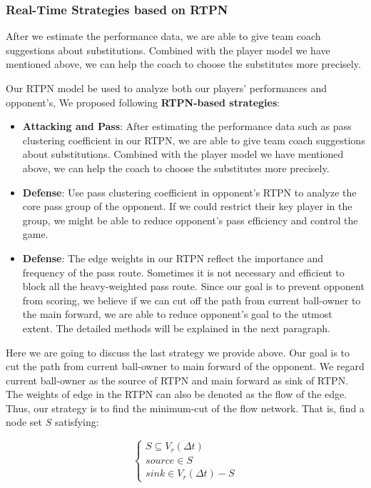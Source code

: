 \documentclass{mcmthesis}
\begin{document}
\subsubsection{Real-Time Strategies based on RTPN}\label{Sec:RTPN2}
After we estimate the performance data, we are able to give team coach suggestions about substitutions. Combined with the player model we have mentioned above, we can help the coach to choose the substitutes more precisely.

Our RTPN model be used to analyze both our players' performances and opponent's, We proposed following \textbf{RTPN-based strategies}:

\begin{itemize}
    \item \textbf{Attacking and Pass}: After estimating the performance data such as pass clustering coefficient in our RTPN, we are able to give team coach suggestions about substitutions. Combined with the player model we have mentioned above, we can help the coach to choose the substitutes more precisely.
    \item \textbf{Defense}: Use pass clustering coefficient in opponent's RTPN to analyze the core pass group of the opponent. If we could restrict their key player in the group, we might be able to reduce opponent's pass efficiency and control the game.
    \item \textbf{Defense}: The edge weights in our RTPN reflect the importance and frequency of the pass route. Sometimes it is not necessary and efficient to block all the heavy-weighted pass route. Since our goal is to prevent opponent from scoring, we believe if we can cut off the path from current ball-owner to the main forward, we are able to reduce opponent's goal to the utmost extent. The detailed methods will be explained in the next paragraph.
\end{itemize}

 Here we are going to discuss the last strategy we provide above. Our goal is to cut the path from current ball-owner to main forward of the opponent. We regard current ball-owner as the source of RTPN and main forward as sink of RTPN. The weights of edge in the RTPN can also be denoted as the flow of the edge. Thus, our strategy is to find the minimum-cut of the flow network. That is, find a node set $S$ satisfying:

$$
\begin{cases}
    S \subseteq V_r(\Delta{t}) \\
    source \in S \\
    sink \in V_r(\Delta{t}) - S
\end{cases}
$$
\end{document}
